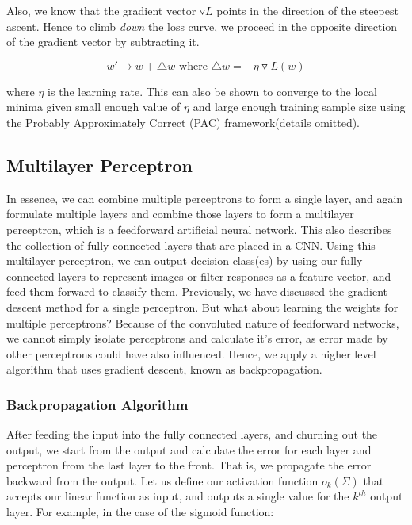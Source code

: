 \documentclass[12pt]{article}
\begin{document}
Also, we know that the gradient vector $\triangledown L$ points in the direction of the steepest ascent. Hence to climb \textit{down} the loss curve, we proceed in the opposite direction of the gradient vector by subtracting it.

\begin{equation*}
w' \rightarrow w + \triangle w \text{\ where } \triangle w =  - \eta \triangledown L(w)
\end{equation*}

where $\eta$ is the learning rate. This can also be shown to converge to the local minima given small enough value of $\eta$ and large enough training sample size using the Probably Approximately Correct (PAC) framework(details omitted).

\subsection{Multilayer Perceptron}

In essence, we can combine multiple perceptrons to form a single layer, and again formulate multiple layers and combine those layers to form a multilayer perceptron, which is a feedforward artificial neural network. This also describes the collection of fully connected layers that are placed in a CNN. Using this multilayer perceptron, we can output decision class(es) by using our fully connected layers to represent images or filter responses as a feature vector, and feed them forward to classify them. Previously, we have discussed the gradient descent method for a single perceptron. But what about learning the weights for multiple perceptrons? Because of the convoluted nature of feedforward networks, we cannot simply isolate perceptrons and calculate it's error, as error made by other perceptrons could have also influenced. Hence, we apply a higher level algorithm that uses gradient descent, known as backpropagation.

\subsubsection{Backpropagation Algorithm}

After feeding the input into the fully connected layers, and churning out the output, we start from the output and calculate the error for each layer and perceptron from the last layer to the front. That is, we propagate the error backward from the output. Let us define our activation function $o_k(\Sigma)$ that accepts our linear function as input, and outputs a single value for the $k^{th}$ output layer. For example, in the case of the sigmoid function:
\end{document}
